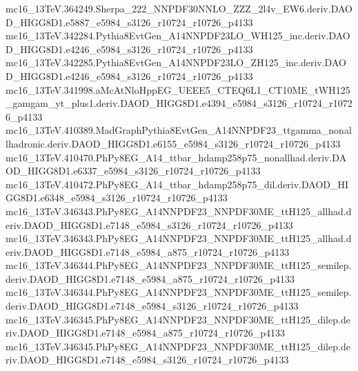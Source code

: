 \begin{footnotesize}
mc16\_13TeV.364249.Sherpa\_222\_NNPDF30NNLO\_ZZZ\_2l4v\_EW6.deriv.DAOD\_HIGG8D1.e5887\_e5984\_s3126\_r10724\_r10726\_p4133 \\
mc16\_13TeV.342284.Pythia8EvtGen\_A14NNPDF23LO\_WH125\_inc.deriv.DAOD\_HIGG8D1.e4246\_e5984\_s3126\_r10724\_r10726\_p4133 \\
mc16\_13TeV.342285.Pythia8EvtGen\_A14NNPDF23LO\_ZH125\_inc.deriv.DAOD\_HIGG8D1.e4246\_e5984\_s3126\_r10724\_r10726\_p4133 \\
mc16\_13TeV.341998.aMcAtNloHppEG\_UEEE5\_CTEQ6L1\_CT10ME\_tWH125\_gamgam\_yt\_plus1.deriv.DAOD\_HIGG8D1.e4394\_e5984\_s3126\_r10724\_r10726\_p4133 \\
mc16\_13TeV.410389.MadGraphPythia8EvtGen\_A14NNPDF23\_ttgamma\_nonallhadronic.deriv.DAOD\_HIGG8D1.e6155\_e5984\_s3126\_r10724\_r10726\_p4133 \\
mc16\_13TeV.410470.PhPy8EG\_A14\_ttbar\_hdamp258p75\_nonallhad.deriv.DAOD\_HIGG8D1.e6337\_e5984\_s3126\_r10724\_r10726\_p4133 \\
mc16\_13TeV.410472.PhPy8EG\_A14\_ttbar\_hdamp258p75\_dil.deriv.DAOD\_HIGG8D1.e6348\_e5984\_s3126\_r10724\_r10726\_p4133 \\
mc16\_13TeV.346343.PhPy8EG\_A14NNPDF23\_NNPDF30ME\_ttH125\_allhad.deriv.DAOD\_HIGG8D1.e7148\_e5984\_s3126\_r10724\_r10726\_p4133 \\
mc16\_13TeV.346343.PhPy8EG\_A14NNPDF23\_NNPDF30ME\_ttH125\_allhad.deriv.DAOD\_HIGG8D1.e7148\_e5984\_a875\_r10724\_r10726\_p4133 \\
mc16\_13TeV.346344.PhPy8EG\_A14NNPDF23\_NNPDF30ME\_ttH125\_semilep.deriv.DAOD\_HIGG8D1.e7148\_e5984\_a875\_r10724\_r10726\_p4133 \\
mc16\_13TeV.346344.PhPy8EG\_A14NNPDF23\_NNPDF30ME\_ttH125\_semilep.deriv.DAOD\_HIGG8D1.e7148\_e5984\_s3126\_r10724\_r10726\_p4133 \\
mc16\_13TeV.346345.PhPy8EG\_A14NNPDF23\_NNPDF30ME\_ttH125\_dilep.deriv.DAOD\_HIGG8D1.e7148\_e5984\_a875\_r10724\_r10726\_p4133 \\
mc16\_13TeV.346345.PhPy8EG\_A14NNPDF23\_NNPDF30ME\_ttH125\_dilep.deriv.DAOD\_HIGG8D1.e7148\_e5984\_s3126\_r10724\_r10726\_p4133 \\

\end{footnotesize}
